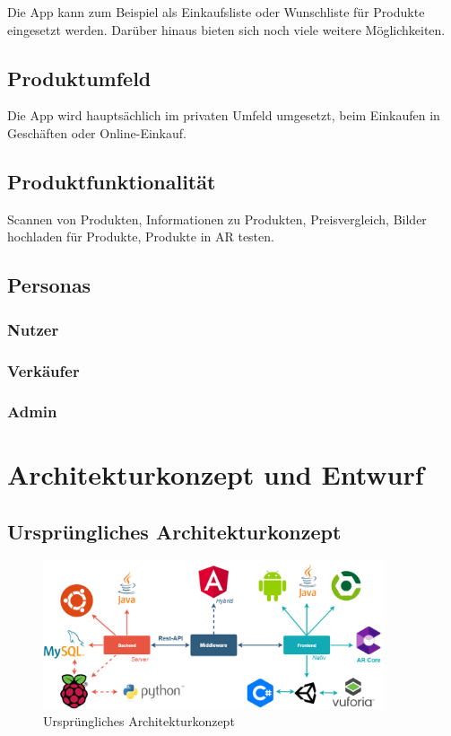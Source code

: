 \documentclass{scrartcl}
\begin{document}
 Die App kann zum Beispiel als Einkaufsliste oder Wunschliste für Produkte eingesetzt werden.
 Darüber hinaus bieten sich noch viele weitere Möglichkeiten.

\subsection{Produktumfeld}

Die App wird hauptsächlich im privaten Umfeld umgesetzt, beim Einkaufen in Geschäften oder Online-Einkauf.

\subsection{Produktfunktionalität}

Scannen von Produkten, Informationen zu Produkten, Preisvergleich, Bilder hochladen für Produkte, Produkte in AR testen.

\subsection{Personas}

\subsubsection{Nutzer}

\subsubsection{Verkäufer}

\subsubsection{Admin}


\newpage

\section{Architekturkonzept und Entwurf}

\subsection{Ursprüngliches Architekturkonzept}

\begin{figure}[h]
\centering
\includegraphics[width=380px]{img/Architekturkonzept.png}
\caption{Ursprüngliches Architekturkonzept}
\end{figure}
\end{document}
